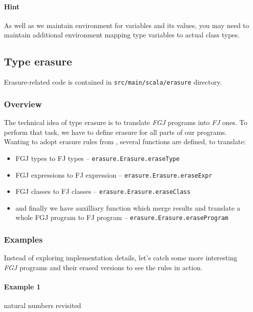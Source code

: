 \documentclass{article}[12pt]
\begin{document}
\paragraph{Hint} As well as we maintain environment for variables
and its values, you may need to maintain additional environment
mapping type variables to actual class types.


\subsection{Type erasure}

Erasure-related code is contained in \texttt{src/main/scala/erasure}
directory.

\subsubsection{Overview}

The technical idea of type erasure is to translate \emph{FGJ}
programs into \emph{FJ} ones. To perform that task, we have to
define erasure for all parts of our programs. Wanting to adopt
erasure rules from \cite{fj}, several functions are defined, to
translate:

\begin{itemize}
\item FGJ types to FJ types -- \texttt{erasure.Erasure.eraseType}
\item FGJ expressions to FJ expression --
  \texttt{erasure.Erasure.eraseExpr}
\item FGJ classes to FJ classes -- \texttt{erasure.Erasure.eraseClass}
\item and finally we have auxilliary function which merge results
  and translate a whole FGJ program to FJ program --
  \texttt{erasure.Erasure.eraseProgram}
\end{itemize}

\subsubsection{Examples}

Instead of exploring implementation details, let's catch some more
interesting \emph{FGJ} programs and their erased versions to see
the rules in action.

\paragraph{Example 1} natural numbers revisited
\end{document}
